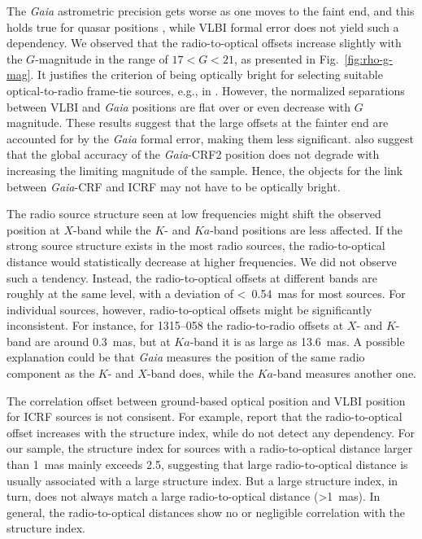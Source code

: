 \documentclass[referee]{aa}        %
\begin{document}
    The \textit{Gaia} astrometric precision gets worse as one moves to the faint end, and this holds true for quasar positions \citep{2016A&A...595A...5M,2018A&A...616A..14G}, while VLBI formal error does not yield such a dependency.
    We observed that the radio-to-optical offsets increase slightly with the $G$-magnitude in the range of $17<G<21$, as presented in Fig.~\ref{fig:rho-g-mag}.
    It justifies the criterion of being optically bright for selecting suitable optical-to-radio frame-tie sources, e.g., in \citet{2008A&A...490..403B,2012MmSAI..83..952M}.
    However, the normalized separations between VLBI and \textit{Gaia} positions are flat over or even decrease with $G$ magnitude.
    These results suggest that the large offsets at the fainter end are accounted for by the \textit{Gaia} formal error, making them less significant.
    \citet{2020A&A...634A..28L} also suggest that the global accuracy of the \textit{Gaia}-CRF2 position does not degrade with increasing the limiting magnitude of the sample.
    Hence, the objects for the link between \textit{Gaia}-CRF and ICRF may not have to be optically bright.

    The radio source structure seen at low frequencies might shift the observed position at $X$-band while the $K$- and $Ka$-band positions are less affected.
    If the strong source structure exists in the most radio sources, the radio-to-optical distance would statistically decrease at higher frequencies.
    We did not observe such a tendency.
    Instead, the radio-to-optical offsets at different bands are roughly at the same level, with a deviation of <~0.54~mas for most sources.
    For individual sources, however, radio-to-optical offsets might be significantly inconsistent.
    For instance, for 1315--058 the radio-to-radio offsets at $X$- and $K$-band are around 0.3~mas, but at $Ka$-band it is as large as 13.6~mas.
    A possible explanation could be that \textit{Gaia} measures the position of the same radio component as the $K$- and $X$-band does, while the $Ka$-band measures another one.

	The correlation offset between ground-based optical position and VLBI position for ICRF sources is not consisent.
	For example, \citet{2011A&A...532A.115C,2014AJ....147...95Z} report that the radio-to-optical offset increases with the structure index,
	while \citet{2013MNRAS.430.2797A} do not detect any dependency.
    For our sample, the structure index for sources with a radio-to-optical distance larger than 1~mas mainly exceeds 2.5, suggesting that large radio-to-optical distance is usually associated with a large structure index.
    But a large structure index, in turn, does not always match a large radio-to-optical distance (>1~mas).
    In general, the radio-to-optical distances show no or negligible correlation with the structure index.
\end{document}
